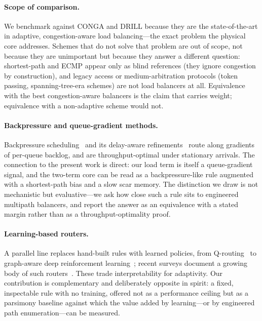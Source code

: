 \paragraph{Scope of comparison.} We benchmark against CONGA and DRILL because
they are the state-of-the-art in adaptive, congestion-aware load balancing---the
exact problem the physical core addresses. Schemes that do not solve that
problem are out of scope, not because they are unimportant but because they
answer a different question: shortest-path and ECMP appear only as blind
references (they ignore congestion by construction), and legacy access or
medium-arbitration protocols (token passing, spanning-tree-era schemes) are
not load balancers at all. Equivalence with the best congestion-aware
balancers is the claim that carries weight; equivalence with a non-adaptive
scheme would not.


\paragraph{Backpressure and queue-gradient methods.}
Backpressure scheduling~\cite{tassiulas1992stability} and its delay-aware
refinements~\cite{ji2013delay} route along gradients of per-queue backlog,
and are throughput-optimal under stationary arrivals. The connection to the
present work is direct: our load term is itself a queue-gradient signal, and
the two-term core can be read as a backpressure-like rule augmented with a
shortest-path bias and a slow scar memory. The distinction we draw is not
mechanistic but evaluative---we ask how close such a rule sits to engineered
multipath balancers, and report the answer as an equivalence with a stated
margin rather than as a throughput-optimality proof.

\paragraph{Learning-based routers.}
A parallel line replaces hand-built rules with learned policies, from
Q-routing~\cite{boyan1994packet} to graph-aware deep reinforcement
learning~\cite{valadarsky2017learning}; recent surveys document a growing
body of such routers~\cite{xiao2021survey}. These trade interpretability for
adaptivity. Our contribution is complementary and deliberately opposite in
spirit: a fixed, inspectable rule with no training, offered not as a
performance ceiling but as a parsimony baseline against which the value added
by learning---or by engineered path enumeration---can be measured.

